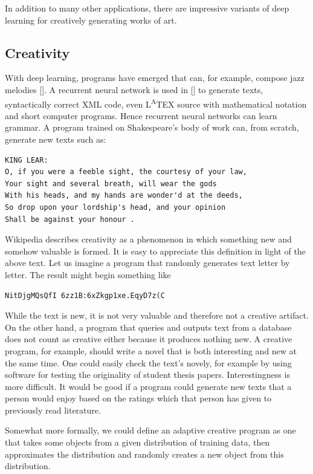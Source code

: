 \documentclass[10pt]{book}
\begin{document}
In addition to many other applications, there are impressive variants of deep learning for creatively generating works of art.

\subsection{Creativity}
With deep learning, programs have emerged that can, for example, compose jazz melodies [\cite{bickerman2010jazz}]. A recurrent neural network is used in [\cite{karpathy2015rnn}] to generate texts, syntactically correct XML code, even L\textsuperscript{A}TEX source with mathematical notation and short computer programs. Hence recurrent neural networks can learn grammar. A program trained on Shakespeare's body of work can, from scratch, generate new texts such as:

\begin{verbatim}
KING LEAR:
O, if you were a feeble sight, the courtesy of your law,
Your sight and several breath, will wear the gods
With his heads, and my hands are wonder'd at the deeds,
So drop upon your lordship's head, and your opinion
Shall be against your honour .
\end{verbatim}

Wikipedia describes creativity as a phenomenon in which something new and somehow valuable is formed. It is easy to appreciate this definition in light of the above text. Let us imagine a program that randomly generates text letter by letter. The result might begin something like

\begin{verbatim}
NitDjgMQsQfI 6zz1B:6xZkgp1xe.EqyD7z(C
\end{verbatim}

While the text is new, it is not very valuable and therefore not a creative artifact. On the other hand, a program that queries and outputs text from a database does not count as creative either because it produces nothing new. A creative program, for example, should write a novel that is both interesting and new at the same time. One could easily check the text's novely, for example by using software for testing the originality of student thesis papers. Interestingness is more difficult. It would be good if a program could generate new texts that a person would enjoy based on the ratings which that person has given to previously read literature.

Somewhat more formally, we could define an adaptive creative program as one that takes some objects from a given distribution of training data, then approximates the distribution and randomly creates a new object from this distribution.
\end{document}
